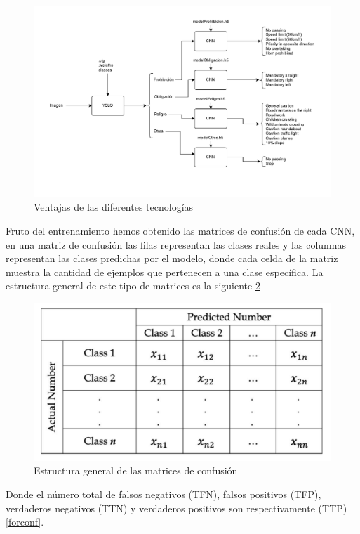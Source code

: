 \begin{figure}[H]
    \centering
 	\includegraphics[width=\textwidth]{Imagenes/IA/EsquemaIA.pdf}
    \caption{Ventajas de las diferentes tecnologías}
    \label{esquema}
\end{figure}

Fruto del entrenamiento hemos obtenido las matrices de confusión de cada CNN, en una matriz de confusión las filas representan las clases reales y las columnas representan las clases predichas por el modelo, donde cada celda de la matriz muestra la cantidad de ejemplos que pertenecen a una clase específica. La estructura general de este tipo de matrices es la siguiente \ref{genconf} \cite{cm}\\

\begin{figure}[H]
    \centering
 	\includegraphics[width=\textwidth]{Imagenes/IA/general_confusion.pdf}
    \caption{Estructura general de las matrices de confusión}
    \label{genconf}
\end{figure}

Donde el número total de falsos negativos (TFN), falsos positivos (TFP), verdaderos negativos (TTN) y verdaderos positivos son respectivamente (TTP) \ref{forconf}.\\

